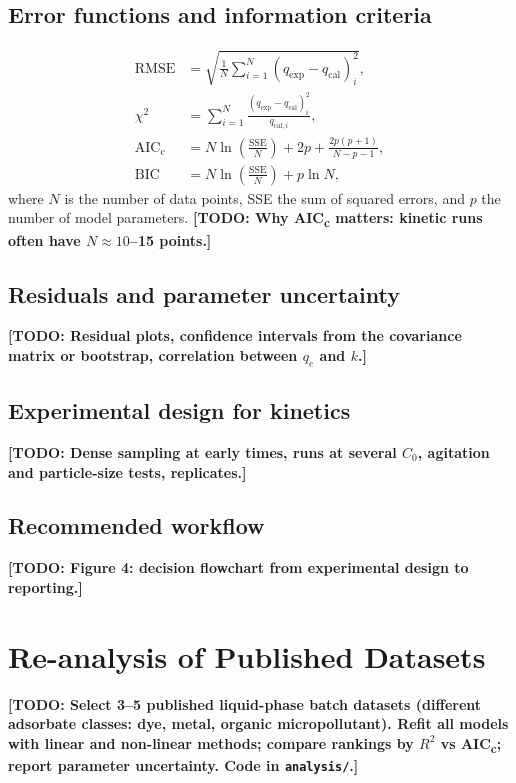 \documentclass[11pt,a4paper]{article}
\newcommand{\todo}[1]{\textbf{[TODO: #1]}}
\begin{document}
\subsection{Error functions and information criteria}
\begin{align}
  \mathrm{RMSE} &= \sqrt{\frac{1}{N}\sum_{i=1}^{N}
            (q_{\mathrm{exp}} - q_{\mathrm{cal}})_i^2},
  \label{eq:rmse}\\
  \chi^2 &= \sum_{i=1}^{N}
            \frac{(q_{\mathrm{exp}} - q_{\mathrm{cal}})_i^2}
                 {q_{\mathrm{cal},i}},
  \label{eq:chi2}\\
  \mathrm{AIC_c} &= N \ln\!\left(\frac{\mathrm{SSE}}{N}\right) + 2p
            + \frac{2p(p+1)}{N - p - 1},
  \label{eq:aicc}\\
  \mathrm{BIC} &= N \ln\!\left(\frac{\mathrm{SSE}}{N}\right) + p\ln N,
  \label{eq:bic}
\end{align}
where $N$ is the number of data points, SSE the sum of squared errors,
and $p$ the number of model parameters.
\todo{Why AIC\textsubscript{c} matters: kinetic runs often have
$N \approx 10$--15 points.}

\subsection{Residuals and parameter uncertainty}
\todo{Residual plots, confidence intervals from the covariance matrix or
bootstrap, correlation between $q_e$ and $k$.}

\subsection{Experimental design for kinetics}
\todo{Dense sampling at early times, runs at several $C_0$, agitation and
particle-size tests, replicates.}

\subsection{Recommended workflow}
\todo{Figure 4: decision flowchart from experimental design to reporting.}

\section{Re-analysis of Published Datasets}
\label{sec:reanalysis}

\todo{Select 3--5 published liquid-phase batch datasets (different
adsorbate classes: dye, metal, organic micropollutant). Refit all models
with linear and non-linear methods; compare rankings by $R^2$ vs
AIC\textsubscript{c}; report parameter uncertainty. Code in
\texttt{analysis/}.}
\end{document}
